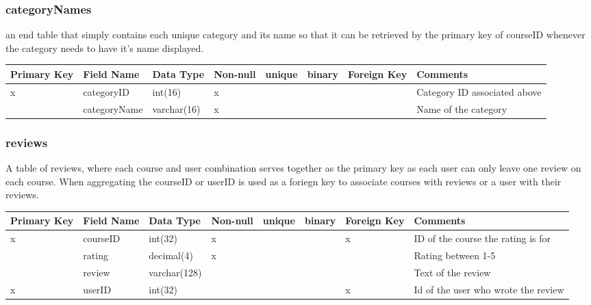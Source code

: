 \documentclass{article}
\begin{document}
\subsubsection{categoryNames}
an end table that simply contains each unique category and its name so that it can be retrieved by the primary key of courseID whenever the category needs to have it's name displayed. \\
\begin{tabular}{|m{1cm} | m{2cm} | m{1.5cm}| m{1cm} | m{1cm}| m{1cm} | m{1cm}| m{4cm}| }
  \hline
  Primary Key & Field Name & Data Type & Non-null & unique & binary & Foreign Key & Comments\\ 
  \hline
  x & categoryID & int(16) & x & & & & Category ID associated above\\
  \hline
   & categoryName & varchar(16) & x & & & & Name of the category\\
  \hline
\end{tabular}

\subsubsection{reviews}
A table of reviews, where each course and user combination serves together as the primary key as each user can only leave one review on each course. When aggregating the courseID or userID is used as a foriegn key to associate courses with reviews or a user with their reviews. \\
\begin{tabular}{|m{1cm} | m{2cm} | m{2.0cm}| m{1cm} | m{1cm}| m{1cm} | m{1cm}| m{3.5cm}| }
  \hline
  Primary Key & Field Name & Data Type & Non-null & unique & binary & Foreign Key & Comments\\ 
  \hline
  x & courseID & int(32) & x & & & x & ID of the course the rating is for\\
  \hline
   & rating & decimal(4) & x & & & & Rating between 1-5\\
  \hline
   & review & varchar(128) & & & & & Text of the review\\
  \hline
  x & userID & int(32) & & & & x & Id of the user who wrote the review\\
  \hline
\end{tabular}
\end{document}
